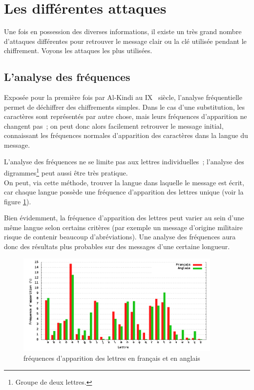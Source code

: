 \section{Les différentes attaques}
Une fois en possession des diverses informations, il existe un
très grand nombre d'attaques différentes pour retrouver le message
clair ou la clé utilisée pendant le chiffrement. Voyons les
attaques les plus utilisées.

\subsection{L'analyse des fréquences\label{sec:AnalyseFrequences}}
Exposée pour la première fois par Al-Kindi au IX\ieme~ siècle,
l'analyse fréquentielle permet de déchiffrer des chiffrements
simples. Dans le cas d'une substitution, les
caractères sont représentés par autre chose, mais leurs fréquences
d'apparition ne changent pas~; on peut donc alors facilement
retrouver le message initial, connaissant les fréquences
normales d'apparition des caractères dans la langue du message.

L'analyse des fréquences ne se limite pas aux lettres
individuelles~; l'analyse des digrammes\footnote{Groupe de deux
lettres.} peut aussi être très
pratique.
\\

On peut, via cette méthode, trouver la langue dans laquelle le
message est écrit, car chaque langue possède une fréquence
d'apparition des lettres unique (voir la figure \ref{fig:Frequences}).

Bien évidemment, la fréquence d'apparition des lettres peut varier
au sein d'une même langue selon certains critères (par exemple un
message d'origine militaire risque de contenir beaucoup
d'abréviations). Une analyse des fréquences aura donc des résultats
plus probables sur des messages d'une certaine longueur.

\begin{figure}[h]
  \centering
    \includegraphics[width=0.9\textwidth]{plot/Frequences.png}
    \caption{fréquences d'apparition des lettres en français et en
anglais}
  \label{fig:Frequences}
\end{figure}

